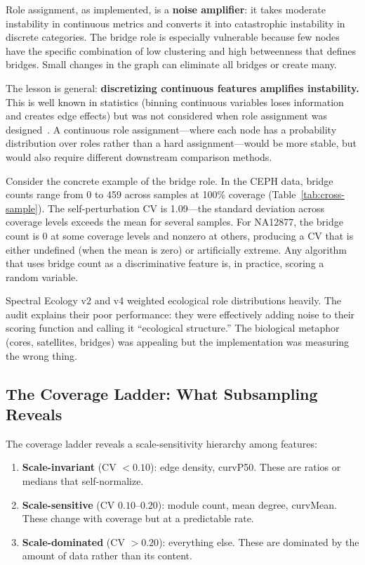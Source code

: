 \documentclass{../yalumba}
\begin{document}
\begin{limitation}
Role assignment, as implemented, is a \textbf{noise amplifier}: it
takes moderate instability in continuous metrics and converts it into
catastrophic instability in discrete categories.  The bridge role is
especially vulnerable because few nodes have the specific combination
of low clustering and high betweenness that defines bridges.  Small
changes in the graph can eliminate all bridges or create many.
\end{limitation}

The lesson is general: \textbf{discretizing continuous features
amplifies instability.}  This is well known in statistics (binning
continuous variables loses information and creates edge effects) but
was not considered when role assignment was
designed~\cite{langfelder2008wgcna}.  A continuous role assignment---where
each node has a probability distribution over roles rather than a hard
assignment---would be more stable, but would also require different
downstream comparison methods.

Consider the concrete example of the bridge role.  In the CEPH data,
bridge counts range from 0 to 459 across samples at 100\% coverage
(Table~\ref{tab:cross-sample}).  The self-perturbation CV is 1.09---the
standard deviation across coverage levels exceeds the mean for several
samples.  For NA12877, the bridge count is 0 at some coverage levels
and nonzero at others, producing a CV that is either undefined (when the
mean is zero) or artificially extreme.  Any algorithm that uses bridge
count as a discriminative feature is, in practice, scoring a random
variable.

Spectral Ecology v2 and v4 weighted ecological role distributions
heavily.  The audit explains their poor performance: they were
effectively adding noise to their scoring function and calling it
``ecological structure.''  The biological metaphor (cores,
satellites, bridges) was appealing but the implementation was
measuring the wrong thing.

\subsection{The Coverage Ladder: What Subsampling Reveals}
\label{sec:coverage-ladder-discussion}

The coverage ladder reveals a scale-sensitivity hierarchy among features:

\begin{enumerate}
  \item \textbf{Scale-invariant} (CV $< 0.10$): edge density, curvP50.
    These are ratios or medians that self-normalize.
  \item \textbf{Scale-sensitive} (CV $0.10$--$0.20$): module count,
    mean degree, curvMean.  These change with coverage but at a
    predictable rate.
  \item \textbf{Scale-dominated} (CV $> 0.20$): everything else.  These
    are dominated by the amount of data rather than its content.
\end{enumerate}
\end{document}
